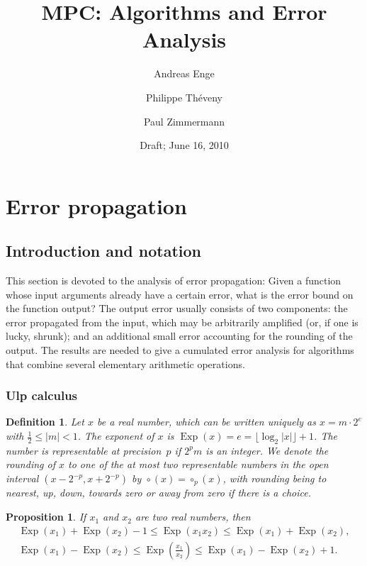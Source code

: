 \documentclass [12pt]{article}
\title {MPC: Algorithms and Error Analysis}
\author {Andreas Enge \and Philippe Th\'eveny \and Paul Zimmermann}
\date {Draft; June 16, 2010}
\DeclareMathOperator{\Exp}{\operatorname {Exp}}
\newcommand {\round}{\operatorname {\circ}}
\renewcommand {\leq}{\leqslant}
\newtheorem{definition}[theorem]{Definition}
\newtheorem{prop}[theorem]{Proposition}
\begin{document}
\maketitle
\tableofcontents


\section {Error propagation}

\subsection {Introduction and notation}

This section is devoted to the analysis of error propagation: Given a function
whose input arguments already have a certain error, what is the error bound on
the function output? The output error usually consists of two components: the
error propagated from the input, which may be arbitrarily amplified (or, if
one is lucky, shrunk); and an
additional small error accounting for the rounding of the output. The results
are needed to give a cumulated error analysis for algorithms that combine
several elementary arithmetic operations.


\subsubsection {Ulp calculus}

\begin {definition}
\label {def:exp}
Let $x$ be a real number, which can be written uniquely as
$x = m \cdot 2^e$ with $\frac{1}{2} \le |m| < 1$.
The {\em exponent} of $x$ is
$\Exp(x) = e = \lfloor \log_2 |x| \rfloor + 1$.
The number is {\em representable at precision~$p$} if
$2^p m$ is an integer.
We denote the rounding of $x$ to one of the at most two representable
numbers in the open interval $(x - 2^{-p}, x + 2^{-p})$ by
$\round (x) = \round_p (x)$, with rounding being to nearest, up, down,
towards zero or away from zero if there is a choice.
\end {definition}

\begin {prop}
\label {prop:expmuldiv}
If $x_1$ and $x_2$ are two real numbers, then
\begin {gather*}
\Exp (x_1) + \Exp (x_2) - 1 \leq \Exp (x_1 x_2) \leq \Exp (x_1) + \Exp (x_2),
\\
\Exp (x_1) - \Exp (x_2) \leq \Exp \left( \frac {x_1}{x_2} \right)
\leq \Exp (x_1) - \Exp (x_2) + 1.
\end {gather*}
\end {prop}
\end{document}
